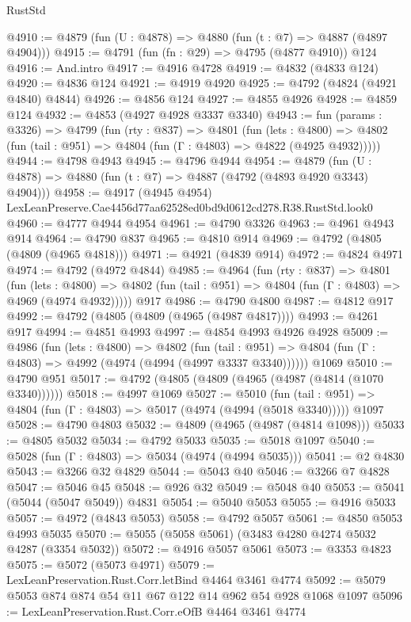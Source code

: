 \begin{lexlean}{RustStd}
\begin{coremodule}
@4910 := @4879 (fun (U : @4878) => @4880 (fun (t : @7) => @4887 (@4897 @4904)))
@4915 := @4791 (fun (fn : @29) => @4795 (@4877 @4910)) @124
@4916 := And.intro
@4917 := @4916 @4728
@4919 := @4832 (@4833 @124)
@4920 := @4836 @124
@4921 := @4919 @4920
@4925 := @4792 (@4824 (@4921 @4840) @4844)
@4926 := @4856 @124
@4927 := @4855 @4926
@4928 := @4859 @124
@4932 := @4853 (@4927 @4928 @3337 @3340)
@4943 := fun (params : @3326) =>
  @4799
    (fun (rty : @837) =>
    @4801
      (fun (lets : @4800) =>
      @4802 (fun (tail : @951) => @4804 (fun (Γ : @4803) => @4822 (@4925 @4932)))))
@4944 := @4798 @4943
@4945 := @4796 @4944
@4954 := @4879 (fun (U : @4878) => @4880 (fun (t : @7) => @4887 (@4792 (@4893 @4920 @3343) @4904)))
@4958 := @4917 (@4945 @4954) LexLeanPreserve.Cae4456d77aa62528ed0bd9d0612cd278.R38.RustStd.look0
@4960 := @4777 @4944 @4954
@4961 := @4790 @3326
@4963 := @4961 @4943 @914
@4964 := @4790 @837
@4965 := @4810 @914
@4969 := @4792 (@4805 (@4809 (@4965 @4818)))
@4971 := @4921 (@4839 @914)
@4972 := @4824 @4971
@4974 := @4792 (@4972 @4844)
@4985 := @4964
    (fun (rty : @837) =>
    @4801
      (fun (lets : @4800) =>
      @4802 (fun (tail : @951) => @4804 (fun (Γ : @4803) => @4969 (@4974 @4932)))))
    @917
@4986 := @4790 @4800
@4987 := @4812 @917
@4992 := @4792 (@4805 (@4809 (@4965 (@4987 @4817))))
@4993 := @4261 @917
@4994 := @4851 @4993
@4997 := @4854 @4993 @4926 @4928
@5009 := @4986
    (fun (lets : @4800) =>
    @4802
      (fun (tail : @951) => @4804 (fun (Γ : @4803) => @4992 (@4974 (@4994 (@4997 @3337 @3340))))))
    @1069
@5010 := @4790 @951
@5017 := @4792 (@4805 (@4809 (@4965 (@4987 (@4814 (@1070 @3340))))))
@5018 := @4997 @1069
@5027 := @5010
    (fun (tail : @951) => @4804 (fun (Γ : @4803) => @5017 (@4974 (@4994 (@5018 @3340)))))
    @1097
@5028 := @4790 @4803
@5032 := @4809 (@4965 (@4987 (@4814 @1098)))
@5033 := @4805 @5032
@5034 := @4792 @5033
@5035 := @5018 @1097
@5040 := @5028 (fun (Γ : @4803) => @5034 (@4974 (@4994 @5035)))
@5041 := @2 @4830
@5043 := @3266 @32 @4829
@5044 := @5043 @40
@5046 := @3266 @7 @4828
@5047 := @5046 @45
@5048 := @926 @32
@5049 := @5048 @40
@5053 := @5041 (@5044 (@5047 @5049)) @4831
@5054 := @5040 @5053
@5055 := @4916 @5033
@5057 := @4972 (@4843 @5053)
@5058 := @4792 @5057
@5061 := @4850 @5053 @4993 @5035
@5070 := @5055 (@5058 @5061) (@3483 @4280 @4274 @5032 @4287 (@3354 @5032))
@5072 := @4916 @5057 @5061
@5073 := @3353 @4823
@5075 := @5072 (@5073 @4971)
@5079 := LexLeanPreservation.Rust.Corr.letBind @4464 @3461 @4774
@5092 := @5079 @5053 @874 @874 @54 @11 @67 @122 @14 @962 @54 @928 @1068 @1097
@5096 := LexLeanPreservation.Rust.Corr.eOfB @4464 @3461 @4774

\end{coremodule}
\end{lexlean}
